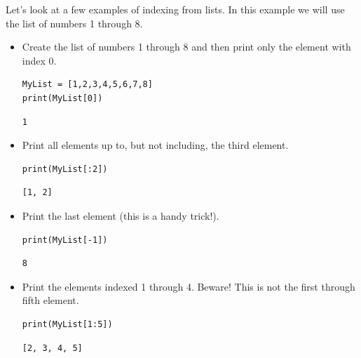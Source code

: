\begin{example}
Let's look at a few examples of indexing from lists.  In this example we will use the list
of numbers 1 through 8.
\begin{itemize}
    \item Create the list of numbers 1 through 8 and then print only the element
        with index 0.

\bcode        
\begin{lstlisting}
MyList = [1,2,3,4,5,6,7,8] 
print(MyList[0]) 
\end{lstlisting}
\boutput
\begin{lstlisting}
1
\end{lstlisting}
\item Print all elements up to, but not including, the third element.

\bcode    
\begin{lstlisting}
print(MyList[:2]) 
\end{lstlisting}
\boutput
\begin{lstlisting}
[1, 2]
\end{lstlisting}

\item Print the last element (this is a handy trick!).

\bcode
\begin{lstlisting}
print(MyList[-1]) 
\end{lstlisting}
\boutput
\begin{lstlisting}
8
\end{lstlisting}

\item Print the elements indexed 1 through 4. Beware!  This is not the first through fifth
    element.

\bcode
\begin{lstlisting}
print(MyList[1:5]) 
\end{lstlisting}
\boutput
\begin{lstlisting}
[2, 3, 4, 5]
\end{lstlisting}
\end{itemize}
\end{example}


